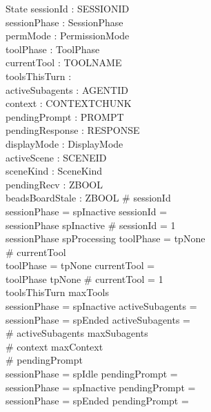 \documentclass[a4paper,10pt,fleqn]{article}
\begin{document}
\begin{schema}{State}
  sessionId : \finset SESSIONID \\
  sessionPhase : SessionPhase \\
  permMode : PermissionMode \\
  toolPhase : ToolPhase \\
  currentTool : \finset TOOLNAME \\
  toolsThisTurn : \nat \\
  activeSubagents : \finset AGENTID \\
  context : \seq CONTEXTCHUNK \\
  pendingPrompt : \finset PROMPT \\
  pendingResponse : \finset RESPONSE \\
  displayMode : DisplayMode \\
  activeScene : \finset SCENEID \\
  sceneKind : \finset SceneKind \\
  pendingRecv : ZBOOL \\
  beadsBoardStale : ZBOOL
  \where
  \# sessionId  \\
  sessionPhase = spInactive \implies sessionId = \emptyset \\
  sessionPhase \neq spInactive \implies \# sessionId = 1 \\
  sessionPhase \neq spProcessing \implies toolPhase = tpNone \\
  \# currentTool  \\
  toolPhase = tpNone \implies currentTool = \emptyset \\
  toolPhase \neq tpNone \implies \# currentTool = 1 \\
  toolsThisTurn \leq maxTools \\
  sessionPhase = spInactive \implies activeSubagents = \emptyset \\
  sessionPhase = spEnded \implies activeSubagents = \emptyset \\
  \# activeSubagents \leq maxSubagents \\
  \# context \leq maxContext \\
  \# pendingPrompt  \\
  sessionPhase = spIdle \implies pendingPrompt = \emptyset \\
  sessionPhase = spInactive \implies pendingPrompt = \emptyset \\
  sessionPhase = spEnded \implies pendingPrompt = \emptyset \\

\end{schema}
\end{document}
